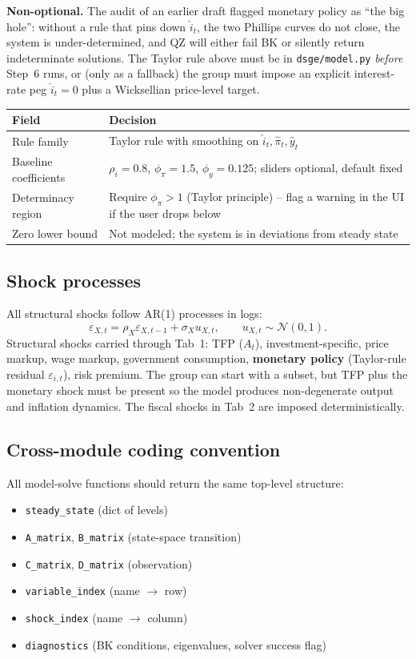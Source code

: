 \documentclass[11pt]{article}
\begin{document}
\begin{warningbox}
\textbf{Non-optional.} The audit of an earlier draft flagged monetary policy as ``the big hole'': without a rule that pins down $\hat{i}_t$, the two Phillips curves do not close, the system is under-determined, and QZ will either fail BK or silently return indeterminate solutions. The Taylor rule above must be in \texttt{dsge/model.py} \emph{before} Step~6 runs, or (only as a fallback) the group must impose an explicit interest-rate peg $\hat{i}_t = 0$ plus a Wicksellian price-level target.
\end{warningbox}

\begin{tabularx}{\linewidth}{@{}p{3.1cm}X@{}}
\toprule
\textbf{Field} & \textbf{Decision} \\
\midrule
Rule family & Taylor rule with smoothing on $\hat{i}_t, \hat{\pi}_t, \hat{y}_t$ \\
Baseline coefficients & $\rho_i=0.8$, $\phi_\pi=1.5$, $\phi_y=0.125$; sliders optional, default fixed \\
Determinacy region & Require $\phi_\pi > 1$ (Taylor principle) -- flag a warning in the UI if the user drops below \\
Zero lower bound & Not modeled; the system is in deviations from steady state \\
\bottomrule
\end{tabularx}

\subsection{Shock processes}
All structural shocks follow AR(1) processes in logs:
\[
\varepsilon_{X,t} = \rho_X \varepsilon_{X,t-1} + \sigma_X u_{X,t}, \qquad u_{X,t} \sim \mathcal{N}(0,1).
\]
Structural shocks carried through Tab~1: TFP ($A_t$), investment-specific, price markup, wage markup, government consumption, \textbf{monetary policy} (Taylor-rule residual $\varepsilon_{i,t}$), risk premium. The group can start with a subset, but TFP plus the monetary shock must be present so the model produces non-degenerate output and inflation dynamics. The fiscal shocks in Tab~2 are imposed deterministically.

\subsection{Cross-module coding convention}
All model-solve functions should return the same top-level structure:
\begin{itemize}
    \item \texttt{steady\_state} (dict of levels)
    \item \texttt{A\_matrix}, \texttt{B\_matrix} (state-space transition)
    \item \texttt{C\_matrix}, \texttt{D\_matrix} (observation)
    \item \texttt{variable\_index} (name $\to$ row)
    \item \texttt{shock\_index} (name $\to$ column)
    \item \texttt{diagnostics} (BK conditions, eigenvalues, solver success flag)
\end{itemize}
\end{document}
